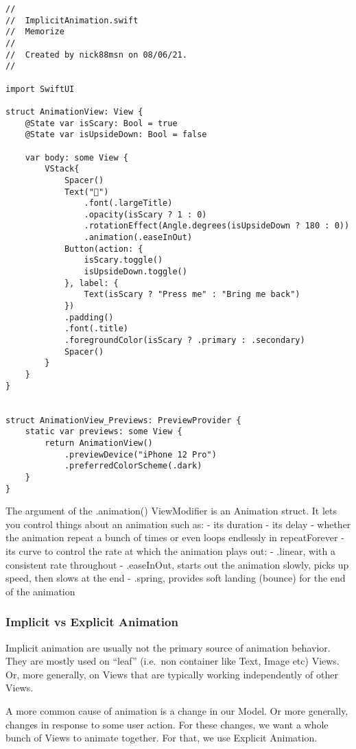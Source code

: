 \documentclass[]{article}
\begin{document}
\begin{verbatim}
//
//  ImplicitAnimation.swift
//  Memorize
//
//  Created by nick88msn on 08/06/21.
//

import SwiftUI

struct AnimationView: View {
    @State var isScary: Bool = true
    @State var isUpsideDown: Bool = false
    
    var body: some View {
        VStack{
            Spacer()
            Text("👻")
                .font(.largeTitle)
                .opacity(isScary ? 1 : 0)
                .rotationEffect(Angle.degrees(isUpsideDown ? 180 : 0))
                .animation(.easeInOut)
            Button(action: {
                isScary.toggle()
                isUpsideDown.toggle()
            }, label: {
                Text(isScary ? "Press me" : "Bring me back")
            })
            .padding()
            .font(.title)
            .foregroundColor(isScary ? .primary : .secondary)
            Spacer()
        }
    }
}


struct AnimationView_Previews: PreviewProvider {
    static var previews: some View {
        return AnimationView()
            .previewDevice("iPhone 12 Pro")
            .preferredColorScheme(.dark)
    }
}
\end{verbatim}

The argument of the .animation() ViewModifier is an Animation struct. It
lets you control things about an animation such as: - its duration - its
delay - whether the animation repeat a bunch of times or even loops
endlessly in repeatForever - its curve to control the rate at which the
animation plays out: - .linear, with a consistent rate throughout -
.easeInOut, starts out the animation slowly, picks up speed, then slows
at the end - .spring, provides soft landing (bounce) for the end of the
animation

\hypertarget{implicit-vs-explicit-animation}{%
\subsubsection{Implicit vs Explicit
Animation}\label{implicit-vs-explicit-animation}}

Implicit animation are usually not the primary source of animation
behavior. They are mostly used on ``leaf'' (i.e.~non container like
Text, Image etc) Views. Or, more generally, on Views that are typically
working independently of other Views.

A more common cause of animation is a change in our Model. Or more
generally, changes in response to some user action. For these changes,
we want a whole bunch of Views to animate together. For that, we use
Explicit Animation.
\end{document}
